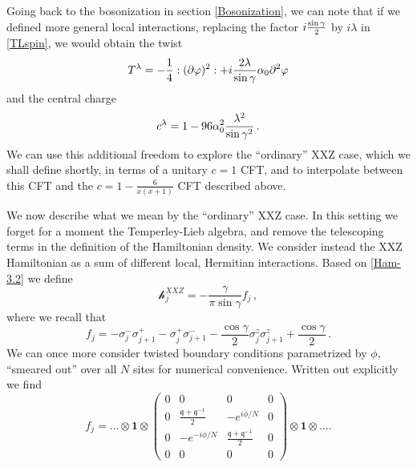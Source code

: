 \documentclass[a4paper,10pt]{article}
\newcommand{\q}{\mathfrak{q}}
\newcommand{\eXXZ}{f}
\begin{document}
Going back to the bosonization in section \ref{Bosonization}, we can note that if we defined more general local interactions, replacing the factor $i{\sin\gamma\over 2}$ by $i\lambda$ in \eqref{TLspin}, we would obtain the twist
%
\begin{equation}\label{T_XXZ}
T^\lambda=-{1\over 4}:(\partial\varphi)^2:+i{2\lambda\over\sin\gamma}\alpha_0\partial^2\varphi
\end{equation}
%
and the central charge
%
\begin{equation}\label{c_XXZ}
c^\lambda=1-96\alpha_0^2 {\lambda^2\over \sin\gamma^2} \,.
\end{equation}
%
%
%
We can use this additional freedom to explore the ``ordinary'' XXZ case, which we shall define shortly, in terms of a unitary $c=1$ CFT, and to interpolate between this CFT and the $c=1-\frac{6}{x(x+1)}$ CFT described above. %


We now describe what we mean by the ``ordinary'' XXZ case. In this setting we forget for a moment the Temperley-Lieb algebra, and remove the telescoping terms in the definition of the Hamiltonian density. We consider instead
%
%
the XXZ Hamiltonian as a sum of different local, Hermitian  interactions. %
%
Based on \eqref{Ham-3.2} we define
\begin{equation}
{\mathcal h}_j^{XXZ}=-\frac{\gamma}{\pi\sin\gamma}f_j\,,
\end{equation}
where we recall that 
\begin{equation}
\eXXZ_j=-\sigma_j^{-}\sigma_{j+1}^{+}-\sigma_j^{+}\sigma_{j+1}^{-}
-\frac{\cos\gamma}{2}\sigma_j^{z}\sigma_{j+1}^{z} +\frac{\cos\gamma}{2} \,.
\end{equation}
%
%
%
We can once more consider twisted boundary conditions parametrized by $\phi$, ``smeared out'' over all $N$ sites for numerical convenience. Written out explicitly we find
\begin{equation}\label{fj_matrix}
f_j = \hdots\otimes\mathbf{1}\otimes
\begin{pmatrix}
0 & 0 & 0 & 0 \\
0 & \frac{\q+\q^{-1}}{2}  & -e^{i\phi/N} & 0\\
0 & -e^{-i\phi/N} & \frac{\q+\q^{-1}}{2} & 0\\
0 & 0 & 0 & 0 
\end{pmatrix} \otimes\mathbf{1}\otimes \hdots.
\end{equation}
\end{document}
